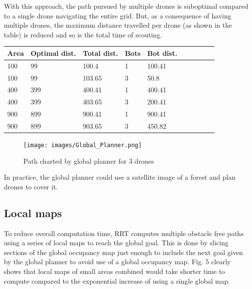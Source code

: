 With this approach, the path pursued by multiple drones is suboptimal compared to a single drone navigating the entire grid. But, as a consequence of having multiple drones, the maximum distance travelled per drone (as shown in the table) is reduced and so is the total time of scouting.

\begin{table}[!ht]
    \centering
    \begin{tabular}{|l|l|l|l|l|l|l|l|l|l|}
    \hline
        Area & Optimal dist. & Total dist. & Bots & Bot dist.\\ \hline
        100 & 99 & 100.4 & 1 & 100.41 \\ \hline
        100 & 99 & 103.65 & 3 & 50.8 \\ \hline
        400 & 399 & 400.41 & 1 & 400.41 \\ \hline
        400 & 399 & 403.65 & 3 & 200.41 \\ \hline
        900 & 899 & 900.41 & 1 & 900.41 \\ \hline
        900 & 899 & 903.65 & 3 & 450.82 \\ \hline
    \end{tabular}
\end{table}


\begin{figure}[h]
\centering
\texttt{[image: images/Global\_Planner.png]}
\caption{Path charted by global planner for 3 drones}
\end{figure}


In practice, the global planner could use a satellite image of a forest and plan drones to cover it. 





\subsection{Local maps}

To reduce overall computation time, RRT computes multiple obstacle free paths
using a series of local maps to reach the global goal. This is done by slicing sections of the global occupancy map just enough to include the next goal given by the global planner to avoid use of a global occupancy map. Fig. 5 clearly shows that local maps of small areas combined would take shorter time to compute compared to the exponential increase of using a single global map.


